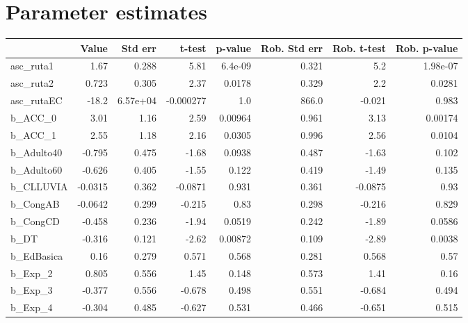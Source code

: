 \section{Parameter estimates}
\begin{tabular}{lrrrrrrr}
\toprule
{} &   Value &  Std err &    t-test &  p-value &  Rob. Std err &  Rob. t-test &  Rob. p-value \\
\midrule
asc\_ruta1     &    1.67 &    0.288 &      5.81 &  6.4e-09 &         0.321 &          5.2 &      1.98e-07 \\
asc\_ruta2     &   0.723 &    0.305 &      2.37 &   0.0178 &         0.329 &          2.2 &        0.0281 \\
asc\_rutaEC    &   -18.2 & 6.57e+04 & -0.000277 &      1.0 &         866.0 &       -0.021 &         0.983 \\
b\_ACC\_0       &    3.01 &     1.16 &      2.59 &  0.00964 &         0.961 &         3.13 &       0.00174 \\
b\_ACC\_1       &    2.55 &     1.18 &      2.16 &   0.0305 &         0.996 &         2.56 &        0.0104 \\
b\_Adulto40    &  -0.795 &    0.475 &     -1.68 &   0.0938 &         0.487 &        -1.63 &         0.102 \\
b\_Adulto60    &  -0.626 &    0.405 &     -1.55 &    0.122 &         0.419 &        -1.49 &         0.135 \\
b\_CLLUVIA     & -0.0315 &    0.362 &   -0.0871 &    0.931 &         0.361 &      -0.0875 &          0.93 \\
b\_CongAB      & -0.0642 &    0.299 &    -0.215 &     0.83 &         0.298 &       -0.216 &         0.829 \\
b\_CongCD      &  -0.458 &    0.236 &     -1.94 &   0.0519 &         0.242 &        -1.89 &        0.0586 \\
b\_DT          &  -0.316 &    0.121 &     -2.62 &  0.00872 &         0.109 &        -2.89 &        0.0038 \\
b\_EdBasica    &    0.16 &    0.279 &     0.571 &    0.568 &         0.281 &        0.568 &          0.57 \\
b\_Exp\_2       &   0.805 &    0.556 &      1.45 &    0.148 &         0.573 &         1.41 &          0.16 \\
b\_Exp\_3       &  -0.377 &    0.556 &    -0.678 &    0.498 &         0.551 &       -0.684 &         0.494 \\
b\_Exp\_4       &  -0.304 &    0.485 &    -0.627 &    0.531 &         0.466 &       -0.651 &         0.515 \\

\end{tabular}
